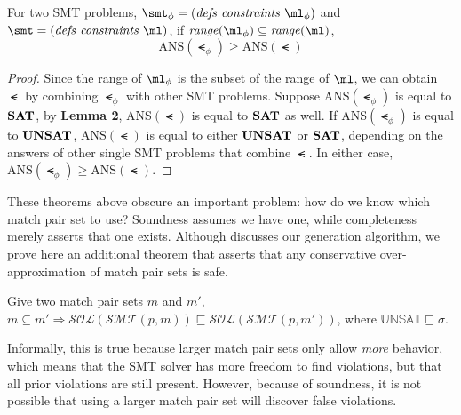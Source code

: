 \begin{theorem}
For two SMT problems, $\smt_{\phi} = (\mathit{defs}\ \mathit{constraints}\ \ml_{\phi})$ and $\smt = (\mathit{defs}\ \mathit{constraints}\ \ml)$,
if $\mathit{range(\ml_{\phi})} \subseteq \mathit{range(\ml)}$,
\[\mathrm{ANS}(\smt_{\phi}) \geq \mathrm{ANS}(\smt)\]
\end{theorem}
\begin{proof}
Since the range of $\ml_{\phi}$ is the subset of the range of $\ml$, we can obtain $\smt$ by combining $\smt_{\phi}$ with other SMT problems. Suppose $\mathrm{ANS}(\smt_{\phi})$ is equal to $\mathit{\textbf{SAT}}$, by \textbf{Lemma 2}, $\mathrm{ANS}(\smt)$ is equal to $\mathit{\textbf{SAT}}$ as well. If $\mathrm{ANS}(\smt_{\phi})$ is equal to $\mathit{\textbf{UNSAT}}$, $\mathrm{ANS}(\smt)$ is equal to either $\mathit{\textbf{UNSAT}}$ or $\mathit{\textbf{SAT}}$, depending on the answers of other single SMT problems that combine $\smt$. In either case, $\mathrm{ANS}(\smt_{\phi}) \geq \mathrm{ANS}(\smt)$.
\end{proof}

These theorems above obscure an important problem: how do we know
which match pair set to use? Soundness assumes we have one, while
completeness merely asserts that one exists. Although 
discusses our generation algorithm, we prove here an additional
theorem that asserts that any conservative over-approximation of match
pair sets is safe.

\begin{theorem}[Approximation]
Give two match pair sets $m$ and $m'$, $m \subseteq m' \Rightarrow \mathcal{SOL}(\mathcal{SMT}(p, m))
  \sqsubseteq \mathcal{SOL}(\mathcal{SMT}(p, m'))$, where
  $\mathbb{UNSAT} \sqsubseteq \sigma$.
\end{theorem}

Informally, this is true because larger match pair sets only allow
\emph{more} behavior, which means that the SMT solver has more freedom
to find violations, but that all prior violations are still
present. However, because of soundness, it is not possible that using
a larger match pair set will discover false violations. 
